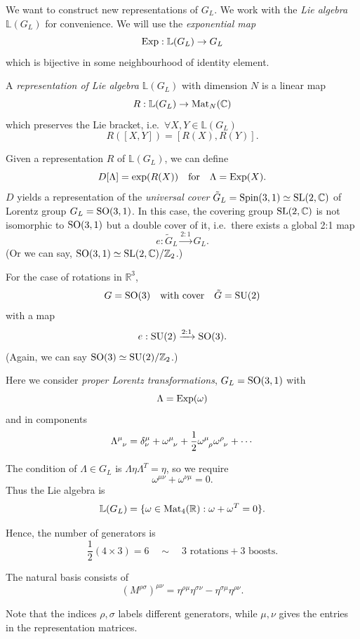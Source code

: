 \documentclass[a4paper,11pt]{article}
\begin{document}
	We want to construct new representations of $G_L$. We work with the \emph{Lie algebra} $\mathbb{L}(G_L)$ for convenience. We will use the \emph{exponential map}
	\[
		\operatorname{Exp} : \mathbb{L}(G_L) \to G_L
	\]
	which is bijective in some neighbourhood of identity element.

	\begin{defi}
		A \emph{representation of Lie algebra $\mathbb{L}(G_L)$} with dimension $N$ is a linear map 
		\[
			R : \mathbb{L}(G_L) \to \operatorname{Mat}_N(\mathbb{C})
		\]
		which preserves the Lie bracket, i.e.\ $\forall X,Y \in \mathbb{L}(G_L)$ 
		\[
			R([X,Y]) = [R(X), R(Y)].
		\]
	\end{defi}
	
	Given a representation $R$ of $\mathbb{L}(G_L)$, we can define
	\[
		D[\Lambda] = \exp(R(X)) \quad \text{for} \quad \Lambda = \operatorname{Exp}(X).
	\]
	$D$ yields a representation of the \emph{universal cover} $\tilde G_L = \text{Spin}(3,1) \simeq \operatorname{SL}(2, \mathbb{C})$ of Lorentz group $G_L = \operatorname{SO}(3,1)$. In this case, the covering group $\operatorname{SL}(2,\mathbb{C})$ is not isomorphic to $\operatorname{SO}(3,1)$ but a double cover of it, i.e.\ there exists a global 2:1 map
	\[
		e : \tilde G_L \xrightarrow{2:1} G_L.
	\]
	(Or we can say, $\operatorname{SO}(3,1) \simeq \operatorname{SL}(2,\mathbb{C})/\mathbb{Z}_2$.)

	For the case of rotations in $\mathbb{R}^3$, 
	\[
		G = \operatorname{SO}(3) \quad \text{with cover} \quad \tilde G = \operatorname{SU}(2)
	\]
	with a map
	\[
		e : \operatorname{SU}(2) \xrightarrow{2:1} \operatorname{SO}(3).
	\]
	(Again, we can say $\operatorname{SO}(3) \simeq \operatorname{SU}(2)/\mathbb{Z}_2$.)

	Here we consider \emph{proper Lorentz transformations}, $G_L = \operatorname{SO}(3,1)$ with
	\[
		\Lambda = \operatorname{Exp}(\omega)
	\]
	and in components 
	\[
		\LT{\mu}{\nu} = \delta^\mu_\nu + \omega\indices{^\mu_\nu} + \frac{1}{2} \omega\indices{^\mu_\rho} \omega\indices{^\rho_\nu} + \cdots 
	\]
	
	The condition of $\Lambda \in G_L$ is $\Lambda \eta \Lambda^T = \eta$, so we require 
	\[
		\omega ^{\mu \nu} + \omega ^{\nu \mu} = 0.
	\]
	Thus the Lie algebra is
	\[
		\mathbb{L}(G_L) = \{\omega \in \operatorname{Mat}_4(\mathbb{R}) : \omega + \omega^T = 0\}.
	\]

	Hence, the number of generators is 
	\[
		\frac{1}{2} (4 \times 3) = 6 \quad \sim \quad \text{3 rotations} + \text{3 boosts}.
	\]
	
	The natural basis consists of 
	\[
		(M ^{\rho \sigma})^{\mu \nu} = \eta ^{\rho \mu} \eta ^{\sigma \nu} - \eta ^{\sigma \mu} \eta ^{\rho \nu}.
	\]

	Note that the indices $\rho,\sigma$ labels different generators, while $\mu,\nu$ gives the entries in the representation matrices.
\end{document}
